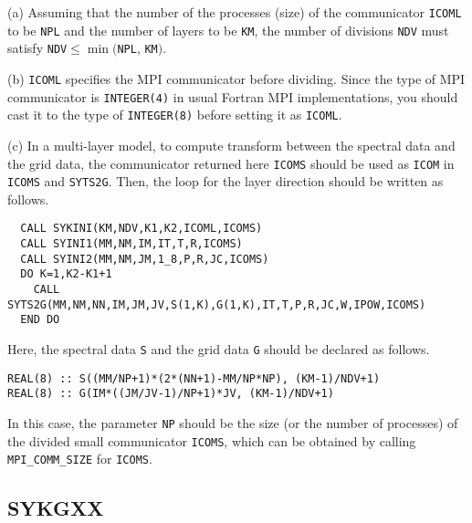 \documentclass[a4paper]{scrartcl}
\begin{document}
\begin{enumerate}
(a) Assuming that the number of the processes (size) of the
  communicator \texttt{ICOML} to be \texttt{NPL} and
  the number of layers to be \texttt{KM}, the number of divisions
  \texttt{NDV} must satisfy
  \texttt{NDV}$\le \min($\texttt{NPL}, \texttt{KM}$)$.  
  

(b) \texttt{ICOML} specifies the MPI communicator before
  dividing. Since the type
of MPI communicator is \texttt{INTEGER(4)} in usual
Fortran MPI implementations, you should cast it to
the type of \texttt{INTEGER(8)} before setting it as \texttt{ICOML}.

(c) In a multi-layer model, to compute transform between
the spectral data and the grid data, the communicator
returned here \texttt{ICOMS} should be used as \texttt{ICOM}
in \texttt{ICOMS} and \texttt{SYTS2G}.
Then, the loop for the layer direction should be written as follows.

\begin{verbatim}  
  CALL SYKINI(KM,NDV,K1,K2,ICOML,ICOMS)
  CALL SYINI1(MM,NM,IM,IT,T,R,ICOMS)
  CALL SYINI2(MM,NM,JM,1_8,P,R,JC,ICOMS)
  DO K=1,K2-K1+1
    CALL SYTS2G(MM,NM,NN,IM,JM,JV,S(1,K),G(1,K),IT,T,P,R,JC,W,IPOW,ICOMS)
  END DO
\end{verbatim}
Here, the spectral data \texttt{S} and the grid data \texttt{G}
should be declared as follows.
\begin{verbatim}        
REAL(8) :: S((MM/NP+1)*(2*(NN+1)-MM/NP*NP), (KM-1)/NDV+1)
REAL(8) :: G(IM*((JM/JV-1)/NP+1)*JV, (KM-1)/NDV+1)
\end{verbatim}
In this case, the parameter \texttt{NP} should be the size
(or the number of processes) of the divided small communicator
\texttt{ICOMS}, which can be obtained by calling
\texttt{MPI\_COMM\_SIZE} for \texttt{ICOMS}.

\end{enumerate}


\subsection{SYKGXX}
\end{document}
